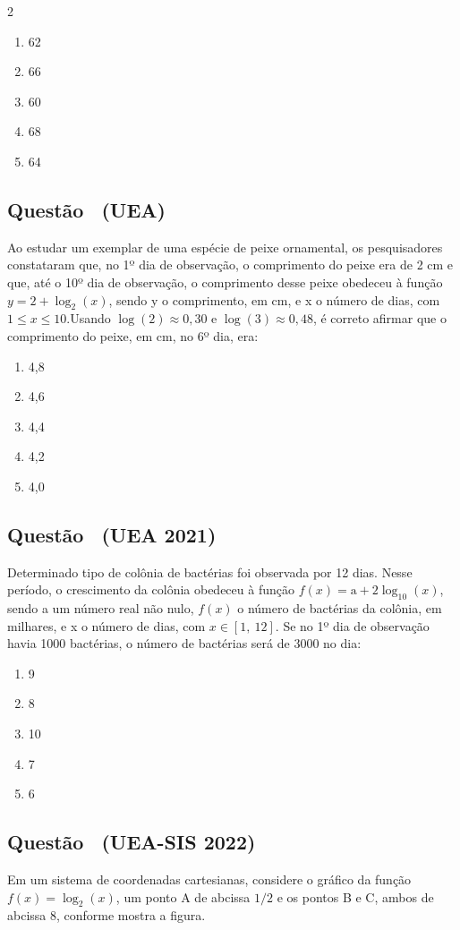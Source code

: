 \documentclass[12pt]{article}
\newcommand{\vermelho}[1]{{\color{red}#1}}
\newcounter{questao}
\newcommand{\novaquestao}[1]{%
  \stepcounter{questao}%
  \subsection*{Questão \thequestao\ (#1)}%
}
\begin{document}
\begin{multicols}{2}
        	\begin{enumerate}[label=(\Alph*), noitemsep]
        		\item 62
        		\item 66
        		\item 60
        		\item 68
        		\item \vermelho{64} %
        	\end{enumerate}
        
        \novaquestao{UEA} Ao estudar um exemplar de uma espécie de peixe ornamental, os pesquisadores constataram que, no 1º dia de observação, o comprimento do peixe era de 2 cm e que, até o 10º dia de observação, o comprimento desse peixe obedeceu à função $y=2+\log_2(x)$, sendo y o comprimento, em cm, e x o número de dias, com $1 \le x \le 10$.Usando $\log(2) \approx 0,30$ e $\log(3) \approx 0,48$, é correto afirmar que o comprimento do peixe, em cm, no 6º dia, era:
        
        	\begin{enumerate}[label=(\Alph*), noitemsep]
        		\item 4,8
        		\item \vermelho{4,6} %
        		\item 4,4
        		\item 4,2
        		\item 4,0
        	\end{enumerate}
        	
        	
        \novaquestao{UEA 2021} Determinado tipo de colônia de bactérias foi observada por 12 dias. Nesse período, o crescimento da colônia obedeceu à função $f(x)=\text{a}+2\log_{10}(x)$, sendo a um número real não nulo, $f(x)$ o número de bactérias da colônia, em milhares, e x o número de dias, com $x \in \left[1,\ 12\right]$. Se no 1º dia de observação havia 1000 bactérias, o número de bactérias será de 3000 no dia:
        
        
        	\begin{enumerate}[label=(\Alph*), noitemsep]
        		\item 9
        		\item 8
        		\item \vermelho{10} %
        		\item 7
        		\item 6
        	\end{enumerate}
        	
        \novaquestao{UEA-SIS 2022} Em um sistema de coordenadas cartesianas, considere o gráfico da função $f(x)=\log_{2}(x)$, um ponto A de abcissa ${1}/{2}$ e os pontos B e C, ambos de abcissa 8, conforme mostra a figura.
        

\end{multicols}
\end{document}
